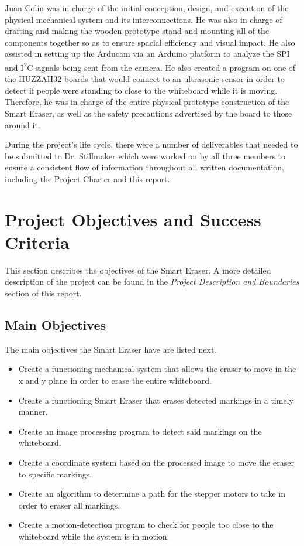  \par
\setlength{\parindent}{2.5ex} Juan Colin was in charge of the initial conception, design, and execution of the physical mechanical system and its interconnections. He was also in charge of drafting and making the wooden prototype stand and mounting all of the components together so as to ensure spacial efficiency and visual impact. He also assisted in setting up the Arducam via an Arduino platform to analyze the SPI and I\textsuperscript{2}C signals being sent from the camera. He also created a program on one of the HUZZAH32 boards that would connect to an ultrasonic sensor in order to detect if people were standing to close to the whiteboard while it is moving. Therefore, he was in charge of the entire physical prototype construction of the Smart Eraser, as well as the safety precautions advertised by the board to those around it.
 \par
\setlength{\parindent}{2.5ex} During the project's life cycle, there were a number of deliverables that needed to be submitted to Dr. Stillmaker which were worked on by all three members to ensure a consistent flow of information throughout all written documentation, including the Project Charter and this report.

 \section{Project Objectives and Success Criteria}
This section describes the objectives of the Smart Eraser. A more detailed description of the project can be found in the \textit{Project Description and Boundaries} section of this report.
\subsection{Main Objectives}
The main objectives the Smart Eraser have are listed next.
 \begin{itemize}
 \item Create a functioning mechanical system that allows the eraser to move in the x and y plane in order to erase the entire whiteboard.
 \item Create a functioning Smart Eraser that erases detected markings in a timely manner.
 \item Create an image processing program to detect said markings on the whiteboard.
 \item Create a coordinate system based on the processed image to move the eraser to specific markings.
 \item Create an algorithm to determine a path for the stepper motors to take in order to eraser all markings.
 \item Create a motion-detection program to check for people too close to the whiteboard while the system is in motion.
 \end{itemize} \par

